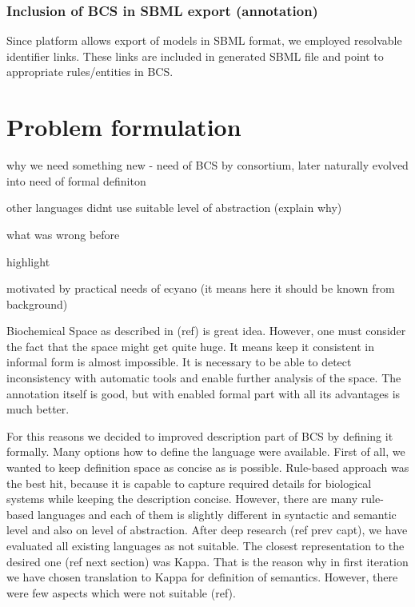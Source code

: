 \documentclass[12pt]{fithesis2}
\begin{document}
\subsection{Inclusion of BCS in SBML export (annotation)}

Since platform allows export of models in SBML format, we employed resolvable identifier links. These links are included in generated SBML file and point to appropriate rules/entities in BCS. 

\chapter{Problem formulation}

why we need something new - need of BCS by consortium, later naturally evolved into need of formal definiton

other languages didnt use suitable level of abstraction (explain why)

what was wrong before

highlight 

motivated by practical needs of ecyano (it means here it should be known from background)

Biochemical Space as described in (ref) is great idea. However, one must consider the fact that the space might get quite huge. It means keep it consistent in informal form is almost impossible. It is necessary to be able to detect inconsistency with automatic tools and enable further analysis of the space. The annotation itself is good, but with enabled formal part with all its advantages is much better. 

For this reasons we decided to improved description part of BCS by defining it formally. Many options how to define the language were available. First of all, we wanted to keep definition space as concise as is possible. Rule-based approach was the best hit, because it is capable to capture required details for biological systems while keeping the description concise. However, there are many rule-based languages and each of them is slightly different in syntactic and semantic level and also on level of abstraction. After deep research (ref prev capt), we have evaluated all existing languages as not suitable. The closest representation to the desired one (ref next section) was Kappa. That is the reason why in first iteration we have chosen translation to Kappa for definition of semantics. However, there were few aspects which were not suitable (ref).
\end{document}
